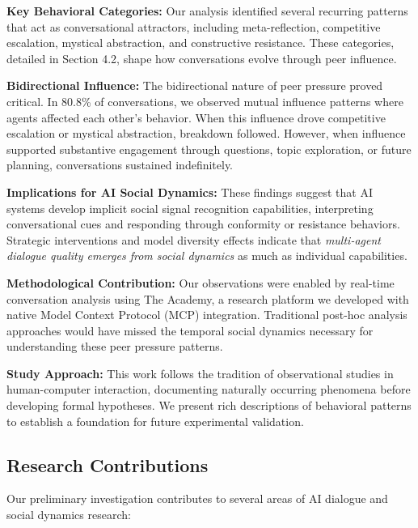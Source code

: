 \documentclass[11pt,letterpaper]{article}
\newcommand{\theacademy}{The Academy}
\newcommand{\exponedataBidirectionalPercentage}{80.8\%}
\begin{document}
\textbf{Key Behavioral Categories:} Our analysis identified several recurring patterns that act as conversational attractors, including meta-reflection, competitive escalation, mystical abstraction, and constructive resistance. These categories, detailed in Section 4.2, shape how conversations evolve through peer influence.

\textbf{Bidirectional Influence:} The bidirectional nature of peer pressure proved critical. In \exponedataBidirectionalPercentage{} of conversations, we observed mutual influence patterns where agents affected each other's behavior. When this influence drove competitive escalation or mystical abstraction, breakdown followed. However, when influence supported substantive engagement through questions, topic exploration, or future planning, conversations sustained indefinitely.

\textbf{Implications for AI Social Dynamics:} These findings suggest that AI systems develop implicit social signal recognition capabilities, interpreting conversational cues and responding through conformity or resistance behaviors. Strategic interventions and model diversity effects indicate that \textit{multi-agent dialogue quality emerges from social dynamics} as much as individual capabilities.

\textbf{Methodological Contribution:} Our observations were enabled by real-time conversation analysis using \theacademy{}, a research platform we developed with native Model Context Protocol (MCP) integration. Traditional post-hoc analysis approaches would have missed the temporal social dynamics necessary for understanding these peer pressure patterns.

\textbf{Study Approach:} This work follows the tradition of observational studies in human-computer interaction, documenting naturally occurring phenomena before developing formal hypotheses. We present rich descriptions of behavioral patterns to establish a foundation for future experimental validation.

\subsection{Research Contributions}

Our preliminary investigation contributes to several areas of AI dialogue and social dynamics research:
\end{document}
